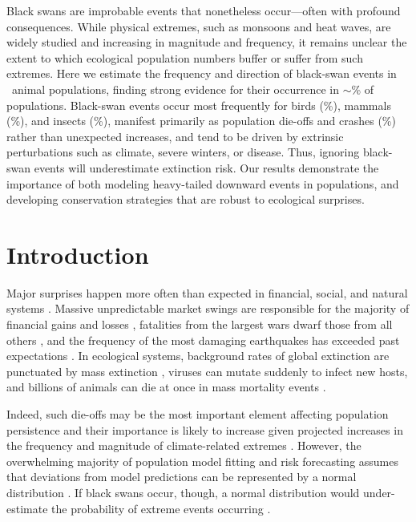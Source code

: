 Black swans are improbable events that nonetheless
occur---often with profound consequences. While physical extremes, such as
monsoons and heat waves, are widely studied and increasing in magnitude and
frequency, it remains unclear the extent to which ecological population numbers
buffer or suffer from such extremes. Here we estimate the frequency and
direction of black-swan events in \NPops\ animal populations, finding strong
evidence for their occurrence in \(\sim\)\overallBasePerc \% of populations.
Black-swan events occur most frequently for birds (\birdPH \%), mammals
(\mammalsPH \%), and insects (\insectsPH \%),
manifest primarily as
population die-offs and crashes (\percBSDown \%) rather than unexpected increases,
and tend to be driven by extrinsic perturbations
such as climate, severe winters, or disease.
Thus, ignoring black-swan events will
underestimate extinction risk.
Our results demonstrate the importance of both
modeling heavy-tailed downward events in populations, and developing
conservation strategies that are robust to ecological surprises.




\section{Introduction}

Major surprises happen more often than expected in
financial, social, and natural systems \citep{taleb2007, sornette2009, may2008}.
Massive unpredictable market swings are responsible for the majority of
financial gains and losses \citep{taleb2007}, fatalities from the largest wars
dwarf those from all others  \citep{newman2005}, and the frequency of the most
damaging earthquakes has exceeded past expectations \citep{sornette2009}. In
ecological systems, background rates of global extinction are punctuated by
mass extinction \citep{harnik2012}, viruses can mutate suddenly to infect new
hosts, and billions of animals can die at once in mass mortality
events \citep{fey2015}.

Indeed, such die-offs may be the most important element
affecting population persistence \citep{mangel1994} and their importance is
likely to increase given projected increases in the frequency and magnitude of
climate-related extremes \citep{ipcc2012}.
However, the overwhelming majority of population model fitting and risk forecasting
assumes that deviations from model predictions can be represented by a normal
distribution \citep[on a log scale; e.g.][]{brook2006a, knape2012}.
If black swans occur, though, a normal distribution would under-estimate the
probability of extreme events occurring \citep{taleb2007}.

